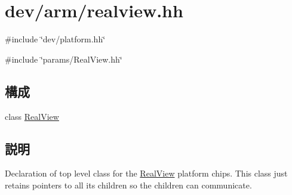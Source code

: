 \hypertarget{realview_8hh}{
\section{dev/arm/realview.hh}
\label{realview_8hh}
}
{\ttfamily \#include \char`\"{}dev/platform.hh\char`\"{}}\par
{\ttfamily \#include \char`\"{}params/RealView.hh\char`\"{}}\par
\subsection*{構成}
\begin{DoxyCompactItemize}
\item 
class \hyperlink{classRealView}{RealView}
\end{DoxyCompactItemize}


\subsection{説明}
Declaration of top level class for the \hyperlink{classRealView}{RealView} platform chips. This class just retains pointers to all its children so the children can communicate. 